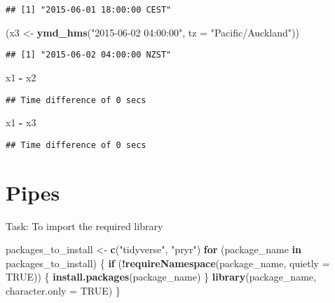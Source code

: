 \documentclass[
]{article}
\newenvironment{Shaded}{\begin{snugshade}}{\end{snugshade}}
\newcommand{\AttributeTok}[1]{\textcolor[rgb]{0.13,0.29,0.53}{#1}}
\newcommand{\ConstantTok}[1]{\textcolor[rgb]{0.56,0.35,0.01}{#1}}
\newcommand{\ControlFlowTok}[1]{\textcolor[rgb]{0.13,0.29,0.53}{\textbf{#1}}}
\newcommand{\FunctionTok}[1]{\textcolor[rgb]{0.13,0.29,0.53}{\textbf{#1}}}
\newcommand{\NormalTok}[1]{#1}
\newcommand{\OtherTok}[1]{\textcolor[rgb]{0.56,0.35,0.01}{#1}}
\newcommand{\SpecialCharTok}[1]{\textcolor[rgb]{0.81,0.36,0.00}{\textbf{#1}}}
\newcommand{\StringTok}[1]{\textcolor[rgb]{0.31,0.60,0.02}{#1}}
\begin{document}
\begin{verbatim}
## [1] "2015-06-01 18:00:00 CEST"
\end{verbatim}

\begin{Shaded}
\begin{Highlighting}[]
\NormalTok{(x3 }\OtherTok{\textless{}{-}} \FunctionTok{ymd\_hms}\NormalTok{(}\StringTok{"2015{-}06{-}02 04:00:00"}\NormalTok{, }\AttributeTok{tz =} \StringTok{"Pacific/Auckland"}\NormalTok{))}
\end{Highlighting}
\end{Shaded}

\begin{verbatim}
## [1] "2015-06-02 04:00:00 NZST"
\end{verbatim}

\begin{Shaded}
\begin{Highlighting}[]
\NormalTok{x1 }\SpecialCharTok{{-}}\NormalTok{ x2}
\end{Highlighting}
\end{Shaded}

\begin{verbatim}
## Time difference of 0 secs
\end{verbatim}

\begin{Shaded}
\begin{Highlighting}[]
\NormalTok{x1 }\SpecialCharTok{{-}}\NormalTok{ x3}
\end{Highlighting}
\end{Shaded}

\begin{verbatim}
## Time difference of 0 secs
\end{verbatim}

\hypertarget{pipes}{%
\section{Pipes}\label{pipes}}

Task: To import the required library

\begin{Shaded}
\begin{Highlighting}[]
\NormalTok{packages\_to\_install }\OtherTok{\textless{}{-}} \FunctionTok{c}\NormalTok{(}\StringTok{"tidyverse"}\NormalTok{, }\StringTok{"pryr"}\NormalTok{)}
\ControlFlowTok{for}\NormalTok{ (package\_name }\ControlFlowTok{in}\NormalTok{ packages\_to\_install) \{}
  \ControlFlowTok{if}\NormalTok{ (}\SpecialCharTok{!}\FunctionTok{requireNamespace}\NormalTok{(package\_name, }\AttributeTok{quietly =} \ConstantTok{TRUE}\NormalTok{)) \{}
    \FunctionTok{install.packages}\NormalTok{(package\_name)}
\NormalTok{  \}}
  \FunctionTok{library}\NormalTok{(package\_name, }\AttributeTok{character.only =} \ConstantTok{TRUE}\NormalTok{)}
\NormalTok{\}}
\end{Highlighting}
\end{Shaded}
\end{document}
